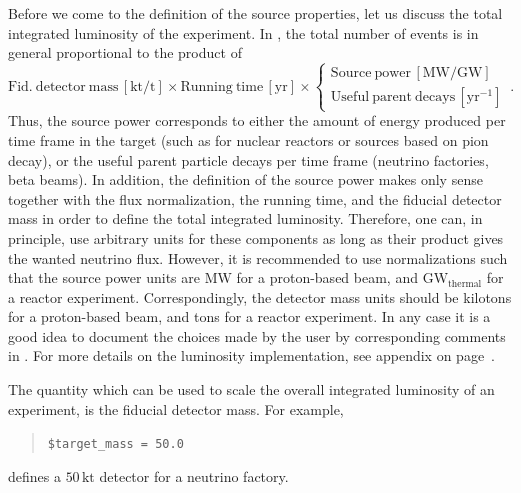 Before we come to the definition of the source properties, let us discuss
the total integrated luminosity of the experiment. In \GLOBES , the total number of events is in general proportional to the product of
\begin{equation}
\mathrm{Fid.~detector~mass}\,\left[\mathrm{kt/t}\right]\times 
\mathrm{Running~time} \,\left[\mathrm{yr}\right]\times\left\{ \begin{array}{c}
\mathrm{Source~power}\,\left[\mathrm{MW/GW}\right]\\
\mathrm{Useful~parent~decays}\,\left[\mathrm{yr}^{-1}\right]
\end{array}\right.\,.
\end{equation}
Thus, the source power corresponds to either the amount of energy produced per time frame in the target (such as for nuclear reactors or sources based on pion decay), or the useful parent particle decays per time frame (neutrino factories, beta beams). In addition, the definition of the source power makes only sense together with the flux normalization, the running time, and the fiducial detector mass in order to define the total integrated luminosity. Therefore, one can, in principle, use arbitrary units for these components as long as their product gives the wanted neutrino flux. However, it is
recommended to use normalizations such that the source power units are $\mathrm{MW}$ for a proton-based beam, and $\mathrm{GW}_\mathrm{thermal}$ for a reactor experiment. Correspondingly, the detector mass units should be kilotons for a proton-based beam, and tons for a reactor experiment. In any case it is a good
idea to document the choices made by the user by corresponding comments
in \AEDL. For more details on the luminosity implementation, see appendix on page~\pageref{app:flux}.

The quantity which can be used to scale the overall integrated luminosity of an experiment, is the fiducial detector mass. For example,
\begin{quote}
{\tt \$target\_mass = 50.0 }
\end{quote}
defines a $50 \, \mathrm{kt}$ detector for a neutrino factory.


